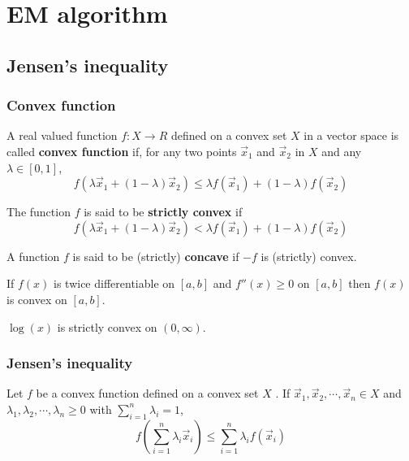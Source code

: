 \chapter{EM algorithm}
\label{chap:EM-algorithm}


\section{Jensen's inequality}

\subsection{Convex function}
\begin{definition}
A real valued function $f : X \rightarrow R$ defined on a convex set $X$ in a vector space is called \textbf{convex function} if, for any two points $\vec{x}_1$ and  $\vec{x}_2$  in $X$ and any $\lambda \in [0,1]$,
\begin{equation}
f(\lambda \vec{x}_1 + (1 - \lambda)\vec{x}_2) \leq \lambda f(\vec{x}_1) + (1 - \lambda)f(\vec{x}_2)
\end{equation}

The function $f$ is said to be \textbf{strictly convex} if
\begin{equation}
f(\lambda \vec{x}_1 + (1 - \lambda)\vec{x}_2) < \lambda f(\vec{x}_1) + (1 - \lambda)f(\vec{x}_2)
\end{equation}
\end{definition}

\begin{definition}
A function $f$ is said to be (strictly) \textbf{concave} if $-f$ is (strictly) convex.
\end{definition}

\begin{theorem}
If $f(x)$ is twice differentiable on $[a, b]$ and $f''(x) \geq 0$ on $[a, b]$ then $f(x)$ is convex on $[a, b]$.
\end{theorem}

\begin{proposition}
$\log(x)$ is strictly convex on $(0, \infty)$.
\end{proposition}


\subsection{Jensen's inequality}
\begin{theorem}
Let $f$ be a convex function defined on a convex set $X$ . If $\vec{x}_1, \vec{x}_2, \cdots , \vec{x}_n \in X$ and $\lambda_1, \lambda_2, \cdots , \lambda_n \geq 0$ with $\sum\limits_{i=1}^n \lambda_i=1$,
\begin{equation}
f\left(\sum\limits_{i=1}^n \lambda_i\vec{x}_i\right) \leq \sum\limits_{i=1}^n {\lambda_i f(\vec{x}_i)}
\end{equation}
\end{theorem}

